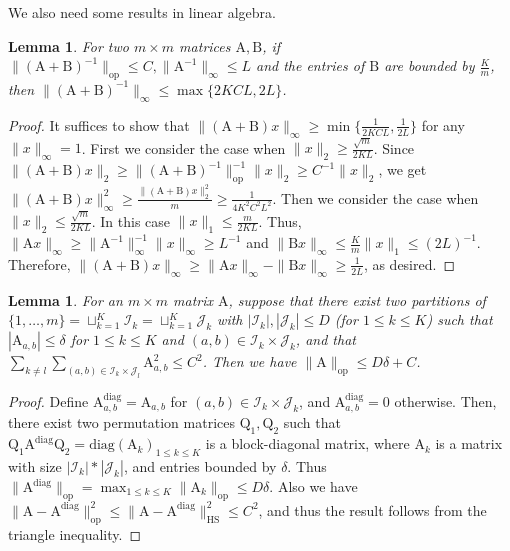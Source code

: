 \documentclass[11pt]{article}
\newtheorem{Lemma}[Theorem]{Lemma}
\numberwithin{equation}{section}
\begin{document}
We also need some results in linear algebra.
\begin{Lemma} {\label{lemma-bound-on-infty-norm}}
For two $m \times m$ matrices $\mathrm{A,B}$, if $\| \mathrm{(A+B)}^{-1} \|_{\mathrm{op}} \leq C, \| \mathrm{A}^{-1} \|_{\infty} \leq L$ and the entries of $\mathrm{B}$ are bounded by $\frac{K}{m}$, then $\| \mathrm{(A+B)}^{-1} \|_{\infty} \leq \max \{ 2KCL, 2L \}$.
\end{Lemma}
\begin{proof}
It suffices to show that $\| \mathrm{(A+B)} x \|_{\infty} \geq \min \{ \frac{1}{2KCL}, \frac{1}{2L} \}$ for any $\| x \|_{\infty} =1$. First we consider the case when $\| x \|_2 \geq \frac{\sqrt{m}}{2KL}$. Since $\| \mathrm{(A+B)}x \|_2 \geq \| \mathrm{(A+B)}^{-1} \|_{\mathrm{op}}^{-1} \| x \|_2 \geq C^{-1} \| x \|_2$, we get $\| \mathrm{(A+B)}x \|^2_{\infty} \geq \frac{ \| \mathrm{(A+B)}x \|^2_2 }{ m } \geq \frac{1}{4 K^2 C^2 L^2}$. Then we consider the case when $\| x \|_2 \leq \frac{\sqrt{m}}{2KL}$. In this case $\| x \|_{1} \leq \frac{m}{2KL}$. Thus, $\| \mathrm{A} x \|_{\infty} \geq \| \mathrm{A}^{-1} \|_{\infty}^{-1} \| x \|_{\infty} \geq L^{-1} $ and $\| \mathrm{B} x  \|_{\infty} \leq \frac{K}{m} \| x \|_{1} \leq (2L)^{-1}$. Therefore, $\| \mathrm{(A+B)} x \|_{\infty} \geq \| \mathrm{A} x \|_{\infty} - \| \mathrm{B} x \|_{\infty}  \geq \frac{1}{2L}$, as desired.
\end{proof}

\begin{Lemma} {\label{lemma-bound-on-op-norm}}
For an $m \times m$ matrix $\mathrm{A}$, suppose that there exist two partitions of $\{ 1,\ldots,m \} = \sqcup_{k=1}^{K} \mathcal{I}_k = \sqcup_{k=1}^{K} \mathcal{J}_k$ with $|\mathcal{I}_k|, |\mathcal{J}_k| \leq D$ (for $1\leq k\leq K$) such that $| \mathrm{A}_{a,b}| \leq \delta$ for $1 \leq k \leq K$ and $(a,b) \in \mathcal{I}_k \times \mathcal{J}_k$,  and that $\sum_{k \neq l} \sum_{ (a,b) \in \mathcal{I}_k \times \mathcal{J}_l } \mathrm{A}_{a,b}^2 \leq C^2$. Then we have $\| \mathrm{A} \|_{\mathrm{op}} \leq D \delta + C$.
\end{Lemma}
\begin{proof}
Define $\mathrm{A}^{\mathrm{diag}}_{a,b} = \mathrm{A}_{a,b}$ for $(a,b) \in \mathcal{I}_k \times \mathcal{J}_k$, and $\mathrm{A}^{\mathrm{diag}}_{a,b} = 0$ otherwise. Then, there exist two permutation matrices $\mathrm{Q_1,Q_2}$ such that $\mathrm{Q}_1  \mathrm{A}^{\mathrm{diag}} \mathrm{Q}_2 = \mathrm{diag}( \mathrm{A}_{k} )_{1 \leq k \leq K}$ is a block-diagonal matrix, where $\mathrm{A}_{k}$ is a matrix with size $|\mathcal{I}_k|*|\mathcal{J}_k|$, and entries bounded by $\delta$. Thus $\| \mathrm{A}^{\mathrm{diag}} \|_{\mathrm{op}} = \max_{1 \leq k \leq K} \| \mathrm{A}_k \|_{\mathrm{op}} \leq D \delta$. Also we have $\| \mathrm{A}- \mathrm{A}^{\mathrm{diag}} \|_{\mathrm{op}}^2 \leq \| \mathrm{A}- \mathrm{A}^{\mathrm{diag}} \|_{\mathrm{HS}}^2 \leq C^2$, and thus the result follows from the triangle inequality.
\end{proof}
\end{document}
